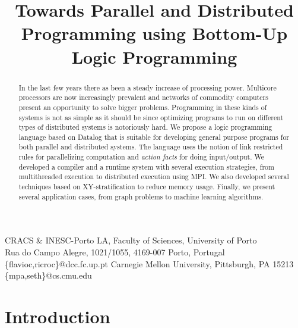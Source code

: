 \documentclass[preprint]{sigplanconf}
\begin{document}
\copyrightdata{[to be supplied]} 


\title{Towards Parallel and Distributed Programming using Bottom-Up Logic Programming}

           {CRACS \& INESC-Porto LA, Faculty of Sciences, University of Porto\\
                  Rua do Campo Alegre, 1021/1055, 4169-007 Porto, Portugal}
           {\{flavioc,ricroc\}@dcc.fc.up.pt}
           {Carnegie Mellon University, Pittsburgh, PA 15213}
           {\{mpa,seth\}@cs.cmu.edu}

\maketitle

\begin{abstract}
In the last few years there as been a steady increase of processing power.
Multicore processors are now increasingly prevalent and networks of commodity computers
present an opportunity to solve bigger problems. Programming in these kinds of
systems is not as simple as it should be since optimizing programs to run on
different types of distributed systems is notoriously hard.
We propose a logic programming language based on Datalog
that is suitable for developing general purpose programs for
both parallel and distributed systems. The language uses the notion of
link restricted rules for parallelizing computation
and \emph{action facts} for doing input/output.
We developed a compiler and a runtime system with several execution strategies,
from multithreaded execution to distributed execution using MPI. We also
developed several techniques based on XY-stratification to reduce memory usage.
Finally, we present several application cases, from graph problems to machine learning
algorithms.
\end{abstract}


\terms

\keywords

\section{Introduction}
\end{document}
